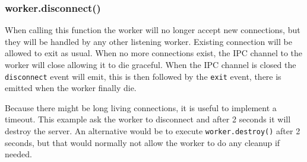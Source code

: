 \subsubsection{worker.disconnect()}

When calling this function the worker will no longer accept new
connections, but they will be handled by any other listening worker.
Existing connection will be allowed to exit as usual. When no more
connections exist, the IPC channel to the worker will close allowing it
to die graceful. When the IPC channel is closed the \texttt{disconnect}
event will emit, this is then followed by the \texttt{exit} event, there
is emitted when the worker finally die.

Because there might be long living connections, it is useful to
implement a timeout. This example ask the worker to disconnect and after
2 seconds it will destroy the server. An alternative would be to execute
\texttt{worker.destroy()} after 2 seconds, but that would normally not
allow the worker to do any cleanup if needed.

